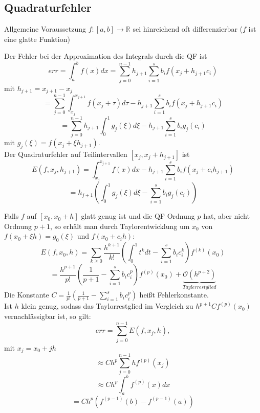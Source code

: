 \subsection{Quadraturfehler}

Allgemeine Voraussetzung $f:[a,b] \rightarrow \mathbb{R}$ sei hinreichend oft differenzierbar ($f$ ist eine glatte Funktion)

\begin{definition}
Der Fehler bei der Approximation des Integrals durch die QF ist 
$$ err = \int_a^b f(x)dx = \sum_{j=0}^{n-1} h_{j+1} \sum_{i=1}^s b_i f(x_j+h_{j+1}c_i)$$
mit $h_{j+1} = x_{j+1}-x_j$
$$ = \sum_{j=0}^{n-1} \int_{x_j}^{x_{j+1}} f(x_j + \tau) d\tau - h_{j+1} \sum_{i=1}^s b_i f(x_j + h_{j+1}c_i)$$
$$ = \sum_{j=0}^{n-1} h_{j+1} \int_0^1 g_j(\xi) d\xi -h_{j+1} \sum_{i=1}^s b_i g_j(c_i)$$
mit $ g_j(\xi) = f(x_j + \xi h_{j+1})$. \\
Der Quadraturfehler auf Teilintervallen $[x_j, x_j+h_{j+1}]$ ist 
$$E(f, x_j, h_{j+1}) = \int_{x_j}^{x_{j+1}} f(x)dx  - h_{j+1} \sum_{i=1}^s b_i f(x_j + c_i h_{j+1})$$
$$= h_{j+1} \left( \int_0^1 g_j(\xi) d\xi - \sum_{i=1}^s b_i g_j(c_i) \right)$$ 
\end{definition}

\begin{nothing}
Falls $f$ auf $[x_0, x_0+h]$ glatt genug ist und die QF Ordnung $p$ hat, aber nicht Ordnung $p+1$, so erhält man durch Taylorentwicklung um $x_0$ von $f(x_0 + \xi h) = g_0(\xi)$ und $f(x_0+c_ih)$:
$$E(f, x_0, h) = \sum_{k\geq 0} \frac{h^{k+1}}{k!} \left( \int_0^1 t^k dt - \sum_{i=1}^s b_i c_i^k \right) f^{(k)}(x_0)$$
$$= \frac{h^{p+1}}{p!} \left( \frac{1}{p+1} - \sum_{i=1}^s b_i c_i^p\right) f^{(p)}(x_0) + \underbrace{\mathcal{O}(h^{p+2})}_{Taylerrestglied}$$
Die Konstante $C = \frac{1}{p!} \left( \frac{1}{p+1} - \sum_{i=1}^s b_i c_i^p \right)$ heißt Fehlerkonstante. \\
Ist $h$ klein genug, sodass das Taylorrestglied im Vergleich zu $h^{p+1}C f^{(p)}(x_0)$ vernachlässigbar ist, so gilt:
$$ err = \sum_{j=0}^{n-1} E(f, x_j, h), $$ 
mit $ x_j = x_0+jh$
$$ \approx Ch^p \sum_{j=0}^{n-1} hf^{(p)}(x_j)$$ 
$$\approx Ch^p \int_a^b f^{(p)}(x)dx$$ 
$$= Ch^p \left(f^{(p-1)}(b) - f^{(p-1)}(a) \right)$$
\end{nothing}

